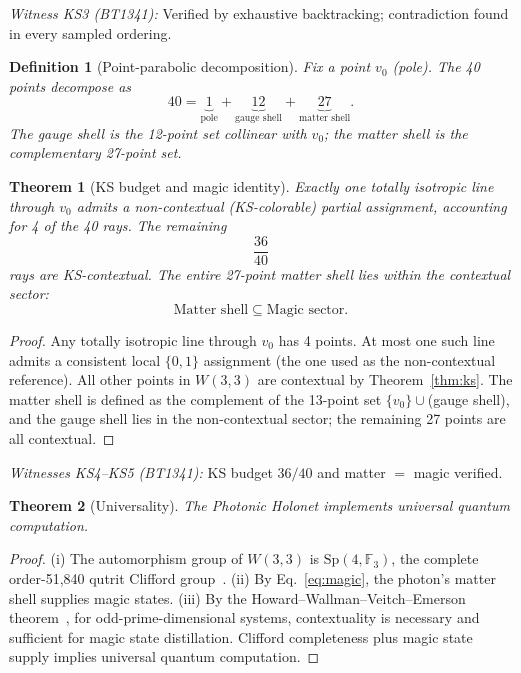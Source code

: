 \documentclass[prl,twocolumn,showpacs,superscriptaddress,longbibliography]{revtex4-2}
\newtheorem{theorem}{Theorem}
\newtheorem{definition}{Definition}
\newcommand{\F}{\mathbb{F}}
\newcommand{\Sp}{\mathrm{Sp}}
\newcommand{\W}{W(3,3)}
\begin{document}
\noindent\emph{Witness KS3 (BT1341):} Verified by exhaustive
backtracking; contradiction found in every sampled ordering.

\begin{definition}[Point-parabolic decomposition]
Fix a point $v_0$ (pole). The 40 points decompose as
\begin{equation}
  40 = \underbrace{1}_{\text{pole}}
     + \underbrace{12}_{\text{gauge shell}}
     + \underbrace{27}_{\text{matter shell}}.
\end{equation}
The gauge shell is the 12-point set collinear with $v_0$;
the matter shell is the complementary 27-point set.
\end{definition}

\begin{theorem}[KS budget and magic identity]\label{thm:magic}
Exactly one totally isotropic line through $v_0$ admits a
non-contextual (KS-colorable) partial assignment, accounting
for 4 of the 40 rays. The remaining
\begin{equation}
  \frac{36}{40}
  \label{eq:ksbudget}
\end{equation}
rays are KS-contextual. The entire 27-point matter shell lies
within the contextual sector:
\begin{equation}
  \text{Matter shell} \subseteq \text{Magic sector}.
  \label{eq:magic}
\end{equation}
\end{theorem}
\begin{proof}
Any totally isotropic line through $v_0$ has 4 points.
At most one such line admits a consistent local $\{0,1\}$ assignment
(the one used as the non-contextual reference).
All other points in $\W$ are contextual by Theorem~\ref{thm:ks}.
The matter shell is defined as the complement of the 13-point
set $\{v_0\}\cup$(gauge shell), and the gauge shell lies in
the non-contextual sector; the remaining 27 points are all contextual.
\end{proof}

\noindent\emph{Witnesses KS4--KS5 (BT1341):} KS budget $36/40$
and matter $=$ magic verified.

\begin{theorem}[Universality]\label{thm:universal}
The Photonic Holonet implements universal quantum computation.
\end{theorem}
\begin{proof}
(i) The automorphism group of $\W$ is $\Sp(4,\F_3)$,
the complete order-51{,}840 qutrit Clifford group~\cite{bt825}.
(ii) By Eq.~\eqref{eq:magic}, the photon's matter shell
supplies magic states.
(iii) By the Howard--Wallman--Veitch--Emerson
theorem~\cite{HWVE2014}, for odd-prime-dimensional systems,
contextuality is necessary and sufficient for magic state
distillation. Clifford completeness plus magic state supply
implies universal quantum computation.
\end{proof}
\end{document}
